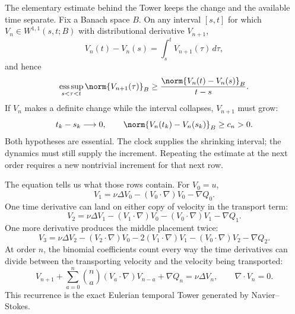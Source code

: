 The elementary estimate behind the Tower keeps the change and the available time separate.
Fix a Banach space \(B\).
On any interval \([s,t]\) for which \(V_n\in W^{1,1}(s,t;B)\) with distributional derivative \(V_{n+1}\),
\[
  V_n(t)-V_n(s)
  =\int_s^tV_{n+1}(\tau)\,d\tau,
\]
and hence
\begin{equation}\label{eq:BodyResponseEscalation}
  \operatorname*{ess\,sup}_{s<\tau<t}
  \norm{V_{n+1}(\tau)}_B
  \geq
  \frac{\norm{V_n(t)-V_n(s)}_B}{t-s}.
\end{equation}
If \(V_n\) makes a definite change while the interval collapses, \(V_{n+1}\) must grow:
\[
  t_k-s_k\longrightarrow0,
  \qquad
  \norm{V_n(t_k)-V_n(s_k)}_B\geq c_n>0.
\]
Both hypotheses are essential.
The clock supplies the shrinking interval; the dynamics must still supply the increment.
Repeating the estimate at the next order requires a new nontrivial increment for that next row.

The equation tells us what those rows contain.
For \(V_0=u\),
\[
  V_1
  =\nu\Delta V_0
  -(V_0\cdot\nabla)V_0
  -\nabla Q_0.
\]
One time derivative can land on either copy of velocity in the transport term:
\[
  V_2
  =\nu\Delta V_1
  -(V_1\cdot\nabla)V_0
  -(V_0\cdot\nabla)V_1
  -\nabla Q_1.
\]
One more derivative produces the middle placement twice:
\[
  V_3
  =\nu\Delta V_2
  -(V_2\cdot\nabla)V_0
  -2(V_1\cdot\nabla)V_1
  -(V_0\cdot\nabla)V_2
  -\nabla Q_2.
\]
At order \(n\), the binomial coefficients count every way the time derivatives can divide between the transporting velocity and the velocity being transported:
\begin{equation}\label{eq:BodyTemporalVelocityRecurrence}
  V_{n+1}
  +\sum_{a=0}^{n}\binom{n}{a}(V_a\cdot\nabla)V_{n-a}
  +\nabla Q_n
  =\nu\Delta V_n,
  \qquad
  \nabla\cdot V_n=0.
\end{equation}
This recurrence is the exact Eulerian temporal Tower generated by Navier--Stokes.

